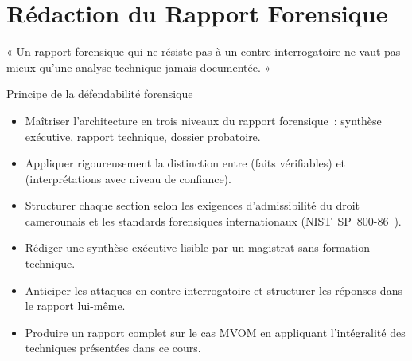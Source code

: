 
\chapter{Rédaction du Rapport Forensique}
\label{chap:rapport}

\epigraph{%
    « Un rapport forensique qui ne résiste pas à un contre-interrogatoire
    ne vaut pas mieux qu'une analyse technique jamais documentée. »%
}{Principe de la défendabilité forensique}


\begin{boxobjectifs}
\begin{itemize}
    \item Maîtriser l'architecture en trois niveaux du rapport
          forensique~: synthèse exécutive, rapport technique,
          dossier probatoire.
    \item Appliquer rigoureusement la distinction entre
           (faits vérifiables) et
           (interprétations avec niveau de
          confiance).
    \item Structurer chaque section selon les exigences
          d'admissibilité du droit camerounais et les standards
          forensiques internationaux (NIST~SP~800-86~\cite{nist80086}).
    \item Rédiger une synthèse exécutive lisible par un magistrat
          sans formation technique.
    \item Anticiper les attaques en contre-interrogatoire et
          structurer les réponses dans le rapport lui-même.
    \item Produire un rapport complet sur le cas MVOM en appliquant
          l'intégralité des techniques présentées dans ce cours.
\end{itemize}
\end{boxobjectifs}

\bigskip

